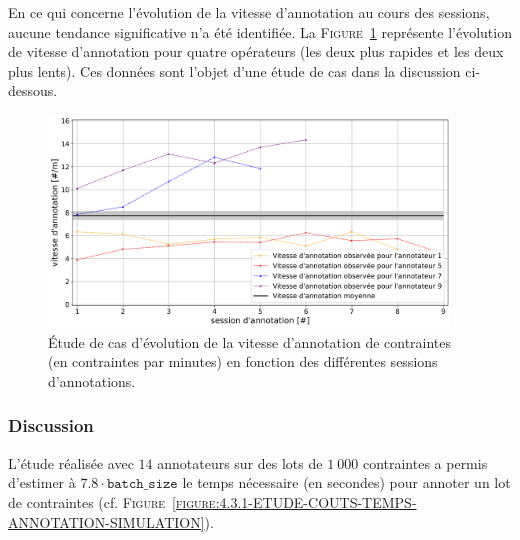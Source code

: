 			En ce qui concerne l'évolution de la vitesse d'annotation au cours des sessions, aucune tendance significative n'a été identifiée. 
			La \textsc{Figure~\ref{figure:4.3.1-ETUDE-COUTS-TEMPS-ANNOTATION-EXEMPLE}} représente l'évolution de vitesse d'annotation pour quatre opérateurs (les deux plus rapides et les deux plus lents).
			Ces données sont l'objet d'une étude de cas dans la discussion ci-dessous.
			\begin{figure}[!htb]
				\centering
				\includegraphics[width=0.95\textwidth]{figures/etude-temps-annotation-3-etude-de-cas}
				\caption{
					Étude de cas d'évolution de la vitesse d'annotation de contraintes (en contraintes par minutes) en fonction des différentes sessions d'annotations.
				}
				\label{figure:4.3.1-ETUDE-COUTS-TEMPS-ANNOTATION-EXEMPLE}
			\end{figure}

		\subsubsection{Discussion}

		
		L'étude réalisée avec $14$ annotateurs sur des lots de $1~000$ contraintes a permis d'estimer à $7.8 \cdot \texttt{batch\_size}$ le temps nécessaire (en secondes) pour annoter un lot de contraintes (cf. \textsc{Figure~\ref{figure:4.3.1-ETUDE-COUTS-TEMPS-ANNOTATION-SIMULATION}}).
		

